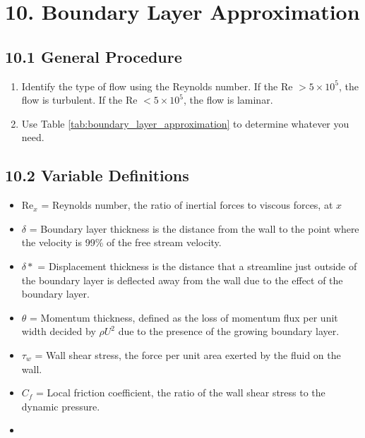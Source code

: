 \section*{10. Boundary Layer Approximation}
\subsection*{10.1 General Procedure}
\begin{enumerate}
    \item Identify the type of flow using the Reynolds number. If the Re $> 5 \times 10^5$, the flow is turbulent. If the Re $< 5 \times 10^5$, the flow is laminar.
    \item Use Table \ref{tab:boundary_layer_approximation} to determine whatever you need.
\end{enumerate}

\subsection*{10.2 Variable Definitions}
\begin{itemize}
    \item Re$_x$ = Reynolds number, the ratio of inertial forces to viscous forces, at $x$
    \item $\delta$ = Boundary layer thickness is the distance from the wall to the point where the velocity is 99\% of the free stream velocity.
    \item $\delta*$ = Displacement thickness is the distance that a streamline just outside 
    of the boundary layer is deflected away from the wall due to the effect 
    of the boundary layer.
    \item $\theta$ = Momentum thickness, defined as the loss of momentum flux per unit width decided by $\rho U^2$
    due to the presence of the growing boundary layer.
    \item $\tau_w$ = Wall shear stress, the force per unit area exerted by the fluid on the wall.
    \item $C_f$ = Local friction coefficient, the ratio of the wall shear stress to the dynamic pressure.
    \item 
\end{itemize}

